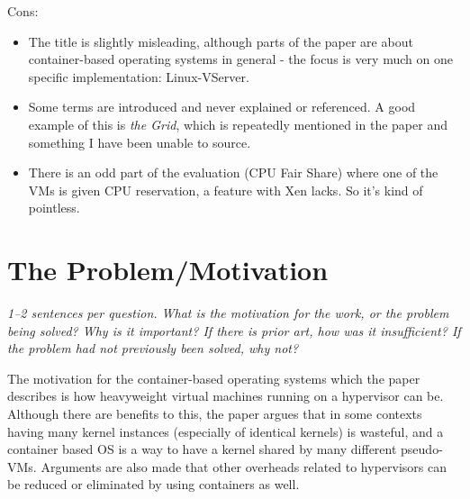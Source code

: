 \documentclass[11pt]{article}
\begin{document}
Cons:

\begin{itemize}

    \item The title is slightly misleading, although parts of the paper are
    about container-based operating systems in general - the focus is very much
    on one specific implementation: Linux-VServer.

    \item Some terms are introduced and never explained or referenced. A good
    example of this is \textit{the Grid}, which is repeatedly mentioned in the
    paper and something I have been unable to source.




    \item There is an odd part of the evaluation (CPU Fair Share) where one of
    the VMs is given CPU reservation, a feature with Xen lacks. So it's kind of
    pointless.



\end{itemize}

\section*{The Problem/Motivation}

\textsl{1--2 sentences per question. What is the motivation for the work, or
the problem being solved? Why is it important? If there is prior art, how was
it insufficient? If the problem had not previously been solved, why not?}

The motivation for the container-based operating systems which the paper
describes is how heavyweight virtual machines running on a hypervisor can be.
Although there are benefits to this, the paper argues that in some contexts
having many kernel instances (especially of identical kernels) is wasteful, and
a container based OS is a way to have a kernel shared by many different
pseudo-VMs. Arguments are also made that other overheads related to hypervisors
can be reduced or eliminated by using containers as well.
\end{document}
